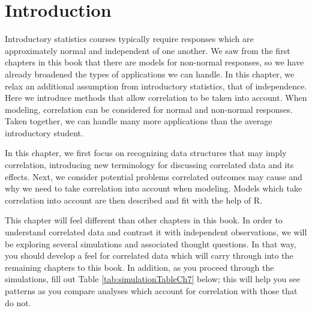 \documentclass[
]{krantz}
\begin{document}
\hypertarget{introduction-1}{%
\section{Introduction}\label{introduction-1}}

Introductory statistics courses typically require responses which are approximately normal and independent of one another. We saw from the first chapters in this book that there are models for non-normal responses, so we have already broadened the types of applications we can handle. In this chapter, we relax an additional assumption from introductory statistics, that of independence. Here we introduce methods that allow correlation to be taken into account. When modeling, correlation can be considered for normal and non-normal responses. Taken together, we can handle many more applications than the average introductory student.

In this chapter, we first focus on recognizing data structures that may imply correlation, introducing new terminology for discussing correlated data and its effects. Next, we consider potential problems correlated outcomes may cause and why we need to take correlation into account when modeling. Models which take correlation into account are then described and fit with the help of R.

This chapter will feel different than other chapters in this book. In order to understand correlated data and contrast it with independent observations, we will be exploring several simulations and associated thought questions. In that way, you should develop a feel for correlated data which will carry through into the remaining chapters to this book. In addition, as you proceed through the simulations, fill out Table \ref{tab:simulationTableCh7} below; this will help you see patterns as you compare analyses which account for correlation with those that do not.
\end{document}

